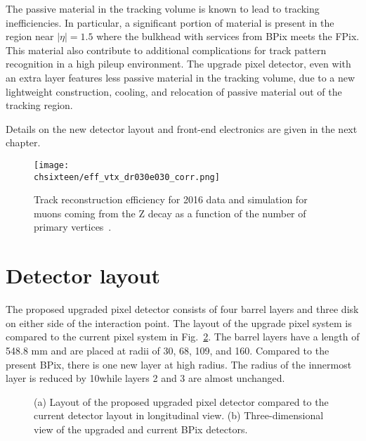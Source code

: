 The passive material in the tracking volume is known to lead to tracking inefficiencies.
In particular, a significant portion of material is present in the region near $|\eta| = 1.5$ where the bulkhead with services from BPix meets the FPix.
This material also contribute to additional complications for track pattern recognition in a high pileup environment.
The upgrade pixel detector, even with an extra layer features less passive material in the tracking volume, due to a new lightweight construction, cooling, and relocation of passive material out of the tracking region.

Details on the new detector layout and front-end electronics are given in the next chapter.

\begin{figure}[!htb]
 \begin{center}
 \texttt{[image: \\chsixteen/eff\_vtx\_dr030e030\_corr.png]}
 \end{center}
 \caption{Track reconstruction efficiency for 2016 data and simulation for muons coming from the Z decay as a function of the number of primary vertices~\cite{TrkCMSPublicResults}.}
 \label{fig:trackEffPix}
\end{figure}

\section{Detector layout}

The proposed upgraded pixel detector consists of four barrel layers and three disk on either side of the interaction point. The layout of the upgrade pixel system is compared to the current pixel system in Fig.~\ref{fig:Phase1Layout}.
The barrel layers have a length of 548.8 mm and are placed at radii of 30, 68, 109, and 160\mm. Compared to the present BPix, there is one new layer at high radius.
The radius of the innermost layer is reduced by 10\mm while layers 2 and 3 are almost unchanged. 

\begin{figure}[!htb]
 \begin{center}
 \hspace{0.2cm}
 \end{center}
 \caption{(a) Layout of the proposed upgraded pixel detector compared to the current detector layout in longitudinal view. (b) Three-dimensional view of the upgraded and current BPix detectors.}
 \label{fig:Phase1Layout}
\end{figure}

